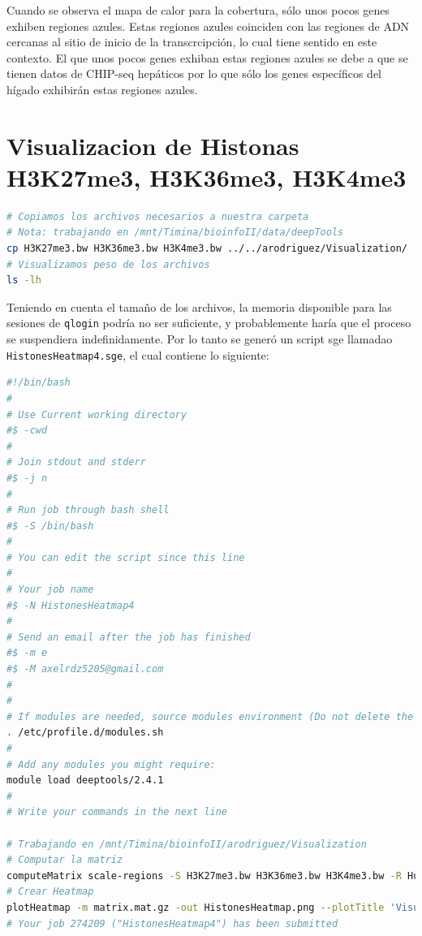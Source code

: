 \documentclass[
]{article}
\newcommand{\passthrough}[1]{#1}
\begin{document}
Cuando se observa el mapa de calor para la cobertura, sólo unos pocos
genes exhiben regiones azules. Estas regiones azules coinciden con las
regiones de ADN cercanas al sitio de inicio de la transcrcipción, lo
cual tiene sentido en este contexto. El que unos pocos genes exhiban
estas regiones azules se debe a que se tienen datos de CHIP-seq
hepáticos por lo que sólo los genes específicos del hígado exhibirán
estas regiones azules.

\hypertarget{visualizacion-de-histonas-h3k27me3-h3k36me3-h3k4me3}{%
\section{Visualizacion de Histonas H3K27me3, H3K36me3,
H3K4me3}\label{visualizacion-de-histonas-h3k27me3-h3k36me3-h3k4me3}}

\begin{lstlisting}[language=bash]
# Copiamos los archivos necesarios a nuestra carpeta
# Nota: trabajando en /mnt/Timina/bioinfoII/data/deepTools
cp H3K27me3.bw H3K36me3.bw H3K4me3.bw ../../arodriguez/Visualization/
# Visualizamos peso de los archivos
ls -lh
\end{lstlisting}

Teniendo en cuenta el tamaño de los archivos, la memoria disponible para
las sesiones de \passthrough{\lstinline!qlogin!} podría no ser
suficiente, y probablemente haría que el proceso se suspendiera
indefinidamente. Por lo tanto se generó un script sge llamadao
\passthrough{\lstinline!HistonesHeatmap4.sge!}, el cual contiene lo
siguiente:

\begin{lstlisting}[language=bash]
#!/bin/bash
#
# Use Current working directory
#$ -cwd
#
# Join stdout and stderr
#$ -j n
#
# Run job through bash shell
#$ -S /bin/bash
#
# You can edit the script since this line
#
# Your job name
#$ -N HistonesHeatmap4
#
# Send an email after the job has finished
#$ -m e
#$ -M axelrdz5205@gmail.com
#
#
# If modules are needed, source modules environment (Do not delete the next line):
. /etc/profile.d/modules.sh
#
# Add any modules you might require:
module load deeptools/2.4.1
#
# Write your commands in the next line

# Trabajando en /mnt/Timina/bioinfoII/arodriguez/Visualization
# Computar la matriz
computeMatrix scale-regions -S H3K27me3.bw H3K36me3.bw H3K4me3.bw -R Human38_genesGencodev39.bed --beforeRegionStartLength 1000 --regionBodyLength 1000 --afterRegionStartLength 1000 --skipZeros -o matrix.mat.gz
# Crear Heatmap
plotHeatmap -m matrix.mat.gz -out HistonesHeatmap.png --plotTitle 'Visualization of Human H3K27me3, H3K36me3, H3K4me3 ChIP data'
# Your job 274209 ("HistonesHeatmap4") has been submitted
\end{lstlisting}
\end{document}
